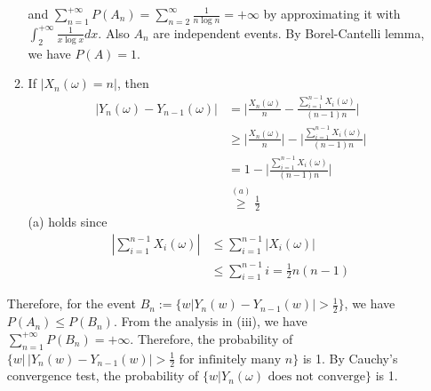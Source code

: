 \documentclass{article}
\begin{document}
\begin{enumerate}
\begin{enumerate}[label=(\roman*)]
    and $\sum_{n=1}^{+\infty} P(A_n) = \sum_{n=2}^{\infty}\frac{1}{n\log n}=+\infty$ by approximating it with $\int_{2}^{+\infty} \frac{1}{x\log x}dx$. Also $A_n$ are independent events. By Borel-Cantelli lemma, we have $P(A)=1$.
    \item If $|X_n(\omega)=n|$, then
    \begin{align*}
        |Y_n(\omega)-Y_{n-1}(\omega)|
        & = \Big|\frac{X_n(\omega)}{n} - \frac{\sum_{i=1}^{n-1} X_i(\omega) }{(n-1)n} \Big| \\
        &\geq \Big|\frac{X_n(\omega)}{n} \Big|- \Big|\frac{\sum_{i=1}^{n-1} X_i(\omega) }{(n-1)n} \Big|\\
        &=1-\Big|\frac{\sum_{i=1}^{n-1} X_i(\omega) }{(n-1)n} \Big|\\
        &\stackrel{(a)}{\geq} \frac{1}{2}
    \end{align*}
    (a) holds since 
    \begin{align*}
        |\sum_{i=1}^{n-1} X_i(\omega) | &\leq \sum_{i=1}^{n-1}| X_i(\omega) | \\
        &\leq \sum_{i=1}^{n-1} i = \frac{1}{2}n(n-1)
    \end{align*}
\end{enumerate}
Therefore, for the event $B_n:=\{w | Y_n(w) - Y_{n-1}(w)| > \frac{1}{2}\}$, we have $P(A_n) \leq P(B_n)$. From the analysis in
(iii), we have $\sum_{n=1}^{+\infty}P(B_n) = +\infty$.
Therefore, the probability of $\{w \big|\, | Y_n(w) - Y_{n-1}(w)| > \frac{1}{2} \textrm{ for infinitely many } n\}$ is 1.
By Cauchy's convergence test, the probability of $\{w | Y_n(\omega) \textrm{ does not converge}\}$ is 1.
\end{enumerate}
\end{document}
